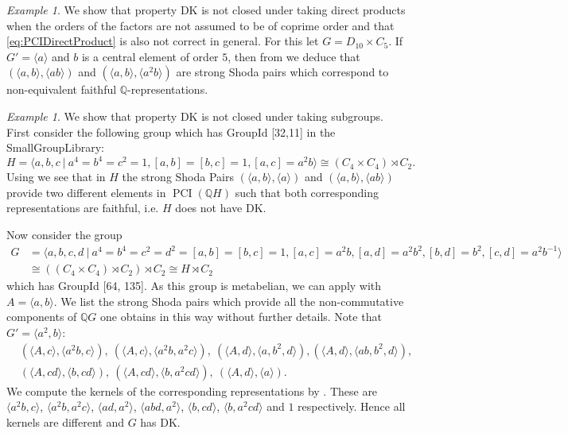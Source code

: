 \documentclass[a4paper,10pt]{amsart}
\theoremstyle{definition}
\theoremstyle{remark}
\newtheorem{example}[lemma]{Example}
\newcommand\PCI{\operatorname{PCI}}
\newcommand{\Q}{{\mathbb Q}}
\begin{document}
\begin{example}\label{ex:DirectProductNoDK}
We show that property DK is not closed under taking direct products when the orders of the factors are not assumed to be of coprime order and that \eqref{eq:PCIDirectProduct} is also not correct in general. For this let $G = D_{10} \times C_5$. If $G' = \langle a \rangle$ and $b$ is a central element of order $5$, then from  we deduce that $(\langle a,b \rangle , \langle ab \rangle)$ and $(\langle a,b \rangle , \langle a^2b \rangle)$ are strong Shoda pairs which correspond to non-equivalent faithful $\Q$-representations.
\end{example}

\begin{example}
We show that property DK is not closed under taking subgroups. First consider the following group which has GroupId [32,11] in the SmallGroupLibrary\cite{SmallGroupLibrary}:
\[H = \langle a,b,c \ | \ a^4=b^4=c^2=1, [a,b]=[b,c]=1, [a,c]=a^2b \rangle \cong (C_4 \times C_4) \rtimes C_2. \]
Using  we see that  in $H$ the strong Shoda Pairs $(\langle a,b \rangle, \langle a \rangle)$ and $(\langle a,b \rangle, \langle ab \rangle)$ provide two different elements in $\PCI(\Q H)$ such that both corresponding representations are faithful, i.e. $H$ does not have DK.

Now consider the group
\begin{align*}
G &= \langle a,b,c,d \ | \ a^4=b^4=c^2=d^2= [a,b]=[b,c]=1, [a,c]=a^2b, [a,d] = a^2b^2, [b,d]=b^2, [c,d] = a^2b^{-1} \rangle \\
&\cong ((C_4\times C_4) \rtimes C_2) \rtimes C_2 \cong H \rtimes C_2
\end{align*}
which has GroupId [64, 135]. As this group is metabelian, we can apply  with $A = \langle a, b\rangle$. We list the strong Shoda pairs which provide all the non-commutative components of $\Q G$ one obtains in this way without further details. Note that $G' = \langle a^2, b \rangle$:\\
\begin{align*}
&(\langle A, c \rangle, \langle a^2b, c \rangle), \ (\langle A, c \rangle, \langle a^2b, a^2c \rangle), \ (\langle A, d \rangle, \langle a,b^2, d \rangle), (\langle A, d \rangle, \langle ab, b^2, d \rangle),  \\  
&(\langle A, cd \rangle, \langle b, cd \rangle), \ (\langle A, cd \rangle, \langle b, a^2cd \rangle), \ (\langle A, d \rangle, \langle a \rangle).
\end{align*}
We compute the kernels of the corresponding representations by . These are $\langle a^2b, c \rangle$, $\langle a^2b, a^2c \rangle$, $\langle ad, a^2 \rangle$, $\langle abd, a^2 \rangle$, $\langle b, cd \rangle$, $\langle b, a^2cd \rangle$ and $1$ respectively. Hence all kernels are different and $G$ has DK. 
\end{example}
\end{document}
